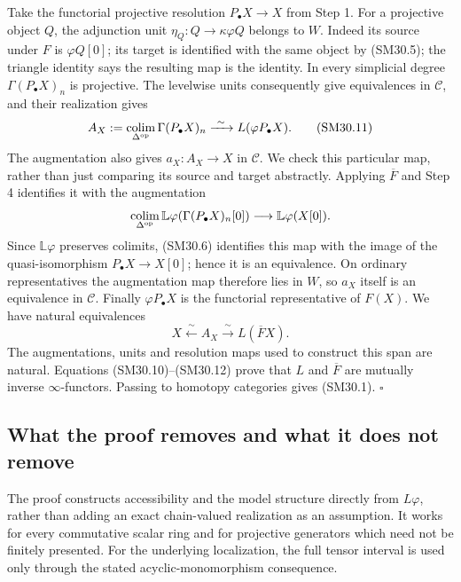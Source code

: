 Take the functorial projective resolution \(P_\bullet X\to X\)
from Step 1.  For a projective object \(Q\), the adjunction
unit \(\eta_Q:Q\to\kappa\varphi Q\) belongs to \(W\).
Indeed its source under \(F\) is \(\varphi Q[0]\); its
target is identified with the same object by (SM30.5); the
triangle identity says the resulting map is the identity.
In every simplicial degree \(\Gamma(P_\bullet X)_n\) is
projective.  The levelwise units consequently give equivalences
in \(\mathcal C\), and their realization gives
\[
 A_X:=\operatorname*{colim}_{\Delta^{\rm op}}
                    \Gamma(P_\bullet X)_n
       \xrightarrow{\ \sim\ }L(\varphi P_\bullet X).
                                                               \tag{SM30.11}
\]
The augmentation also gives \(a_X:A_X\to X\) in \(\mathcal C\).
We check this particular map, rather than just comparing its
source and target abstractly.  Applying \(\overline F\) and
Step 4 identifies it with the augmentation
\[
 \operatorname*{colim}_{\Delta^{\rm op}}
       \mathbb L\varphi(\Gamma(P_\bullet X)_n[0])
                   \longrightarrow\mathbb L\varphi(X[0]).
\]
Since \(\mathbb L\varphi\) preserves colimits, (SM30.6)
identifies this map with the image of the quasi-isomorphism
\(P_\bullet X\to X[0]\); hence it is an equivalence.
On ordinary representatives the augmentation map therefore
lies in \(W\), so \(a_X\) itself is an equivalence in
\(\mathcal C\).  Finally \(\varphi P_\bullet X\) is the
functorial representative of \(F(X)\).  We have natural
equivalences
\[
              X\xleftarrow{\ \sim\ } A_X
                    \xrightarrow{\ \sim\ }L(\overline F X).
                                                               \tag{SM30.12}
\]
The augmentations, units and resolution maps used to construct
this span are natural.  Equations (SM30.10)--(SM30.12) prove
that \(L\) and \(\overline F\) are mutually inverse
\(\infty\)-functors.  Passing to homotopy categories gives
(SM30.1). \(\square\)

\subsection{What the proof removes and what it does not remove}
The proof constructs accessibility and the model structure
directly from \(L\varphi\), rather than adding an exact
chain-valued realization as an assumption.  It works for every
commutative scalar ring and for projective generators which
need not be finitely presented.  For the underlying localization,
the full tensor interval is used only through the stated
acyclic-monomorphism consequence.

